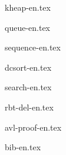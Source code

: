 \documentclass[b5paper,twoside]{book}
\begin{document}
{kheap-en.tex}

{queue-en.tex}

{sequence-en.tex}

{dcsort-en.tex}

{search-en.tex}

\appendix
\noappendicestocpagenum
\addappheadtotoc

{rbt-del-en.tex}

{avl-proof-en.tex}


{bib-en.tex}



\printindex
\end{document}
